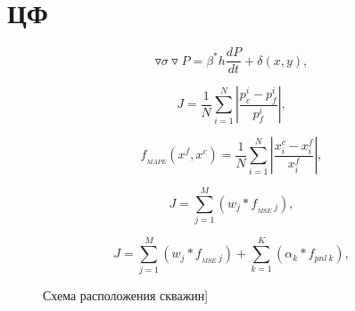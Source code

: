\documentclass[14pt]{article}
\begin{document}
	\section{ЦФ}
	\begin{equation} \label{fil}
		\triangledown\sigma\triangledown P = \beta^*h\frac{dP}{dt}+\delta(x,y),
	\end{equation}
	
	\begin{equation} \label{mape}
		J=\frac{1}{N}\sum_{i=1}^N{\left\vert\frac{p_c^i-p_f^i}{p_f^i}\right\vert},
	\end{equation}

	\begin{equation} \label{mape}
		f_{_{MAPE}}(x^f,x^c)=\frac{1}{N}\sum_{i=1}^N{\left\vert\frac{x_i^c-x_i^f}{x_i^f}\right\vert},
	\end{equation}

	\begin{equation} \label{mape}
		J=\sum_{j=1}^M \left( w_j*f_{_{MSE} \ j} \right),
  	\end{equation}
  
  	\begin{equation} \label{mape}
   		J=\sum_{j=1}^M \left( w_j*f_{_{MSE} \ j} \right) + \sum_{k=1}^K \left( \alpha_k * f_{pnl \ k}\right),
    \end{equation}


\begin{figure}
	\begin{minipage}[h]{0.49\linewidth}
	\end{minipage} \hfill
	\begin{minipage}[h]{0.49\linewidth}
	\end{minipage}
	\caption{Схема расположения скважин]}
	\label{fig:map}
\end{figure}
\end{document}
